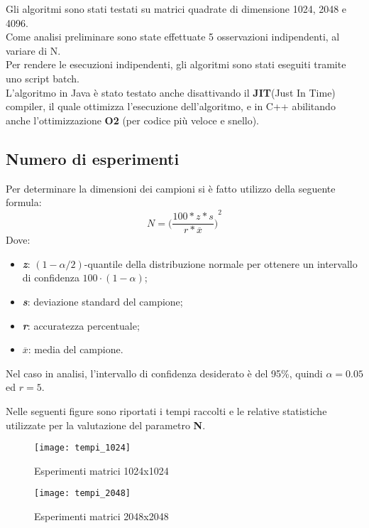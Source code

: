 Gli algoritmi sono stati testati su matrici quadrate di dimensione 1024, 2048 e 4096.\\
Come analisi preliminare sono state effettuate 5 osservazioni indipendenti, al variare di N.\\
Per rendere le esecuzioni indipendenti, gli algoritmi sono stati eseguiti tramite uno
script batch.\\
L'algoritmo in Java è stato testato anche disattivando il \textbf{JIT}(Just In Time)
compiler, il quale ottimizza l'esecuzione dell'algoritmo, e in C++ abilitando anche
l'ottimizzazione \textbf{O2} (per codice più veloce e snello).\\

\subsection{Numero di esperimenti}

Per determinare la dimensioni dei campioni si è fatto utilizzo della seguente formula:
$$N= {\biggl({{\frac{100*z*s}{r*\overline{x}}}\biggr)}^2}$$
Dove:
\begin{itemize}
  \item \textbf{\textit{z}}: $(1-{\alpha / 2})$-quantile della distribuzione normale
  per ottenere un intervallo di confidenza $100\cdot(1-\alpha)$;
  \item \textbf{\textit{s}}: deviazione standard del campione;
  \item \textbf{\textit{r}}: accuratezza percentuale;
  \item \textbf{{$\overline{\textit{x}}$}}: media del campione.
\end{itemize}

Nel caso in analisi, l'intervallo di confidenza desiderato è del 95\%, quindi
$\alpha = 0.05$ ed $ r = 5 $.

Nelle seguenti figure sono riportati i tempi raccolti e le relative statistiche
utilizzate per la valutazione del parametro \textbf{N}.
\begin{figure}[!htbp]
  \texttt{[image: tempi\_1024]}
  \caption{Esperimenti matrici 1024x1024}
  \label{tempi_1024}
\end{figure}

\begin{figure}[!htbp]
  \texttt{[image: tempi\_2048]}
  \caption{Esperimenti matrici 2048x2048}
  \label{tempi_2048}
\end{figure}

